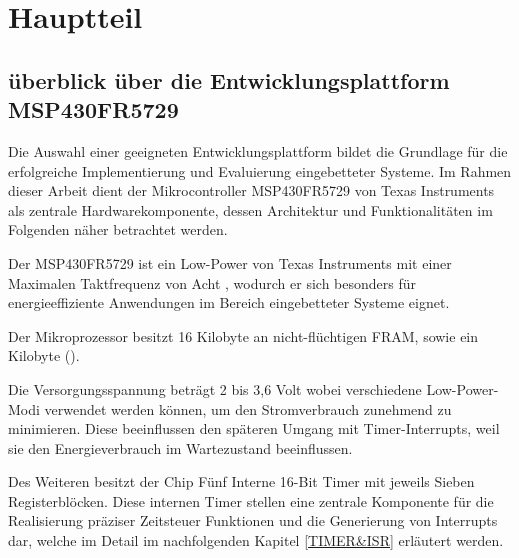 
\chapter{Hauptteil}
\label{cha:Hauptteil}

\section{\"uberblick \"uber die Entwicklungsplattform MSP430FR5729}
\label{EntwicklungsplattformMSP430FR5729}

Die Auswahl einer geeigneten Entwicklungsplattform bildet die Grundlage f\"ur die erfolgreiche Implementierung und Evaluierung eingebetteter Systeme. Im Rahmen dieser Arbeit dient der Mikrocontroller MSP430FR5729 von Texas Instruments als zentrale Hardwarekomponente, dessen Architektur und Funktionalit\"aten im Folgenden n\"aher betrachtet werden.

Der MSP430FR5729 ist ein Low-Power  von Texas Instruments mit einer Maximalen Taktfrequenz von Acht , wodurch er sich besonders f\"ur energieeffiziente Anwendungen im Bereich eingebetteter Systeme eignet. 

Der Mikroprozessor besitzt 16 Kilobyte an nicht-fl\"uchtigen FRAM, sowie ein Kilobyte  (). 

Die Versorgungsspannung betr\"agt 2 bis 3,6 Volt wobei verschiedene Low-Power-Modi verwendet werden k\"onnen, um den Stromverbrauch zunehmend zu minimieren. Diese beeinflussen den sp\"ateren Umgang mit Timer-Interrupts, weil sie den Energieverbrauch im Wartezustand beeinflussen.

Des Weiteren besitzt der Chip F\"unf Interne 16-Bit Timer mit jeweils Sieben  Registerbl\"ocken. Diese internen Timer stellen eine zentrale Komponente f\"ur die Realisierung pr\"aziser Zeitsteuer Funktionen und die Generierung von Interrupts dar, welche im Detail im nachfolgenden Kapitel \ref{TIMER&ISR} erl\"autert werden.

